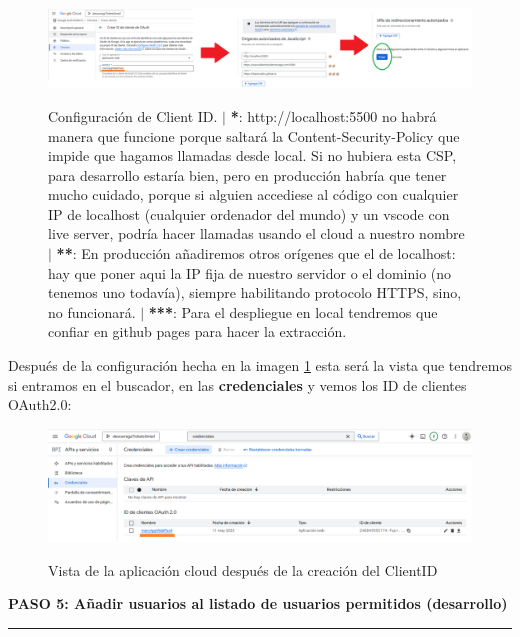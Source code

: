 \documentclass[a4paper,12pt]{report}
\begin{document}
	
	\FloatBarrier
	\setlength{\belowcaptionskip}{3pt}
	\begin{figure}[H]
		\centering
		\caption{Configuración de Client ID.  $|$ \textbf{*}: http://localhost:5500 no habrá manera que funcione porque saltará la Content-Security-Policy que impide que hagamos llamadas desde local. Si no hubiera esta CSP, para desarrollo estaría bien, pero en producción habría que tener mucho cuidado, porque si alguien accediese al código con cualquier IP de localhost (cualquier ordenador del mundo) y un vscode con live server, podría hacer llamadas usando el cloud a nuestro nombre  $|$ \textbf{**}: En producción añadiremos otros orígenes que el de localhost: hay que poner aqui la IP fija de nuestro servidor o el dominio (no tenemos uno todavía), siempre habilitando protocolo HTTPS, sino, no funcionará. $|$ \textbf{***}: Para el despliegue en local tendremos que confiar en github pages para hacer la extracción.}
		\includegraphics[width=1\linewidth]{img/googleCloudE.png} 
		\label{fig:googleCloudE}
	\end{figure}
	\FloatBarrier
	
	
	
	Después de la configuración hecha en la imagen \ref{fig:googleCloudE} esta será la vista que tendremos si entramos en el buscador, en las \textbf{credenciales} y vemos los ID de clientes OAuth2.0:
	
	\FloatBarrier
	\setlength{\belowcaptionskip}{3pt}
	\begin{figure}[H]
		\centering
		\caption{Vista de la aplicación cloud después de la creación del ClientID}
		\includegraphics[width=1\linewidth]{img/googleCloudF}
		\label{fig:googleCloudF}
	\end{figure}
	\FloatBarrier
	
	
	
	\noindent \textbf{PASO 5: Añadir usuarios al listado de usuarios permitidos (desarrollo)}
	\vspace{.1em}
	\hrule
	\vspace{.5em}
	
\end{document}
